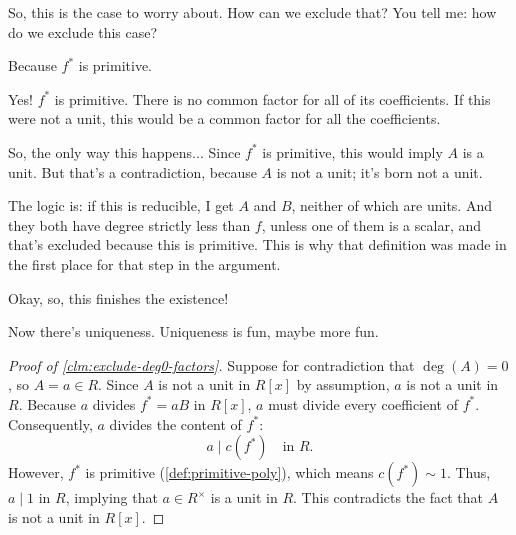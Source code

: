 \begin{proofWrapper}
\begin{speech}[00:29:34 - 00:29:46]
So, this is the case to worry about. How can we exclude that? You tell me: how do we exclude this case?
\end{speech}

\begin{student}
Because $f^*$ is primitive.
\end{student}

\begin{speech}[00:29:48 - 00:30:58]
Yes! $f^*$ is primitive. There is no common factor for all of its coefficients. If this were not a unit, this would be a common factor for all the coefficients.

So, the only way this happens... Since $f^*$ is primitive, this would imply $A$ is a unit.  But that's a contradiction, because $A$ is not a unit; it's born not a unit. 

The logic is: if this is reducible, I get $A$ and $B$, neither of which are units. And they both have degree strictly less than $f$, unless one of them is a scalar, and that's excluded because this is primitive. This is why that definition was made in the first place for that step in the argument.

Okay, so, this finishes the existence!

Now there's uniqueness. Uniqueness is fun, maybe more fun.
\end{speech}

\begin{content}

\begin{proof}[Proof of \cref{clm:exclude-deg0-factors}]
Suppose for contradiction that $\deg(A) = 0$, so $A = a \in R$.
Since $A$ is not a unit in $R[x]$ by assumption, $a$ is not a unit in $R$.
Because $a$ divides $f^* = aB$ in $R[x]$, $a$ must divide every coefficient of $f^*$.
Consequently, $a$ divides the content of $f^*$:
\[
a \mid c(f^*) \quad \text{in } R.
\]
However, $f^*$ is primitive (\cref{def:primitive-poly}), which means $c(f^*) \sim 1$. Thus, $a \mid 1$ in $R$, implying that $a \in R^\times$ is a unit in $R$.
This contradicts the fact that $A$ is not a unit in $R[x]$.
\end{proof}


\end{content}
\end{proofWrapper}
